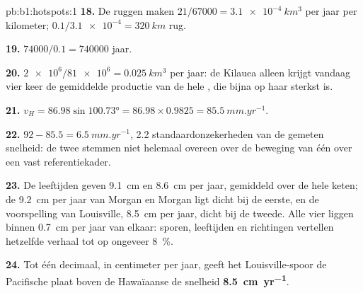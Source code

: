 \begin{solution}{pb:b1:hotspots:1}
\textbf{18.} De ruggen maken $21/67000 = \qty{3.1e-4}{km^3}$ per jaar per
kilometer; $0.1/\num{3.1e-4} = \qty{320}{km}$ rug.

\textbf{19.} $74000/0.1 = \num{740000}$ jaar.

\textbf{20.} $\num{2e6}/\num{81e6} = \qty{0.025}{km^3}$ per jaar: de Kilauea alleen
krijgt vandaag vier keer de gemiddelde productie van de hele , die bijna op haar sterkst is.

\textbf{21.} $v_H = 86.98\sin\ang{100.73} = 86.98\times0.9825 =
\qty{85.5}{mm.yr^{-1}}$.

\textbf{22.} $92 - 85.5 = \qty{6.5}{mm.yr^{-1}}$, 2.2 standaardonzekerheden van
de gemeten snelheid: de twee  stemmen niet helemaal overeen over de beweging van één
 over een vast referentiekader.

\textbf{23.} De leeftijden geven \qty{9.1}{cm} en \qty{8.6}{cm} per jaar, gemiddeld over de hele keten; de \qty{9.2}{cm} per jaar van Morgan en Morgan ligt dicht bij de eerste, en de voorspelling van Louisville, \qty{8.5}{cm} per jaar, dicht bij de tweede. Alle vier liggen binnen \qty{0.7}{cm} per jaar van elkaar: sporen, leeftijden en richtingen vertellen hetzelfde verhaal tot op ongeveer \qty{8}{\percent}.

\textbf{24.} Tot één decimaal, in centimeter per jaar, geeft het Louisville-spoor de Pacifische plaat boven de Hawaïaanse  de snelheid
\textbf{\qty[text-series-to-math=true]{8.5}{cm.yr^{-1}}}.
\end{solution}
